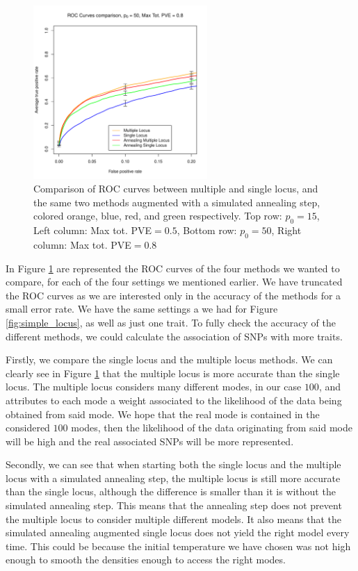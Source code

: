 \documentclass[a4paper, 11pt]{report}
\numberwithin{equation}{chapter}
\begin{document}
\begin{figure}[h!]
\includegraphics[width=2.6in, bb=0 0 500 500]{images/ROC_Comp_p0_50_var_0_8.pdf}
\caption{\label{fig:ROCComp}Comparison of ROC curves between multiple and single locus, and the same two methods augmented with a simulated annealing step, colored orange, blue, red, and green respectively. Top row: $p_0 = 15$, Left column: Max tot. PVE$ = 0.5$,
Bottom row: $p_0 = 50$, Right column: Max tot. PVE$ = 0.8$}
\end{figure}
In Figure \ref{fig:ROCComp} are represented the ROC curves of the four methods we wanted to compare, for each of the four settings we mentioned earlier. We have truncated the ROC curves as we are interested only in the accuracy of the methods for a small error rate. We have the same settings a we had for Figure \ref{fig:simple_locus}, as well as just one trait. To fully check the accuracy of the different methods, we could calculate the association of SNPs with more traits.

Firstly, we compare the single locus and the multiple locus methods. We can clearly see in Figure \ref{fig:ROCComp} that the multiple locus is more accurate than the single locus. The multiple locus considers many different modes, in our case $100$, and attributes to each mode a weight associated to the likelihood of the data being obtained from said mode. We hope that the real mode is contained in the considered $100$ modes, then the likelihood of the data originating from said mode will be high and the real associated SNPs will be more represented.

Secondly, we can see that when starting both the single locus and the multiple locus with a simulated annealing step, the multiple locus is still more accurate than the single locus, although the difference is smaller than it is without the simulated annealing step. This means that the annealing step does not prevent the multiple locus to consider multiple different models. It also means that the simulated annealing augmented single locus does not yield the right model every time. This could be because the initial temperature we have chosen was not high enough to smooth the densities enough to access the right modes.
\end{document}
